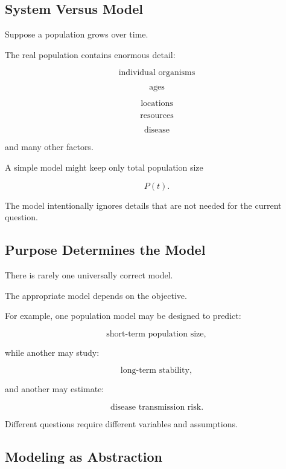 \subsection{System Versus Model}
\label{subsec:system-versus-model}

Suppose a population grows over time.

The real population contains enormous detail:

\[
\boxed{
\text{individual organisms}
}
\]

\[
\boxed{
\text{ages}
}
\]

\[
\boxed{
\text{locations}
}
\]

\[
\boxed{
\text{resources}
}
\]

\[
\boxed{
\text{disease}
}
\]

and many other factors.

A simple model might keep only total population size

\[
\boxed{
P(t).
}
\]

The model intentionally ignores details that are not needed for the current
question.

\subsection{Purpose Determines the Model}
\label{subsec:model-purpose}

There is rarely one universally correct model.

The appropriate model depends on the objective.

For example, one population model may be designed to predict:

\[
\boxed{
\text{short-term population size},
}
\]

while another may study:

\[
\boxed{
\text{long-term stability},
}
\]

and another may estimate:

\[
\boxed{
\text{disease transmission risk}.
}
\]

Different questions require different variables and assumptions.

\subsection{Modeling as Abstraction}
\label{subsec:modeling-abstraction}

